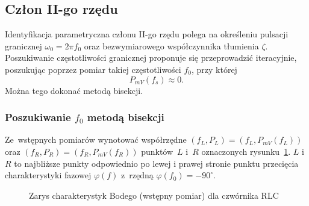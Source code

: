 \documentclass[paper=a4,DIV=12]{lpas}
\newcommand{\degree}{^{\circ}}
\begin{document}
\begin{appendices}
  \subsection{Człon II-go rzędu}
  \label{sec:YDUPM}

  Identyfikacja parametryczna członu II-go rzędu polega na określeniu pulsacji
  granicznej $\omega_0 = 2 \pi f_0$ oraz bezwymiarowego współczynnika tłumienia
  $\zeta$. Poszukiwanie częstotliwości granicznej proponuje się przeprowadzić
  iteracyjnie, poszukując poprzez pomiar takiej częstotliwości $f_0$, przy
  której
  \begin{equation}
    P_{mV}(f_s) \approx 0.
    \label{eq:8AO8B}
  \end{equation}
  Można tego dokonać metodą bisekcji.

  \subsubsection{Poszukiwanie $f_0$ metodą bisekcji}
  \label{sec:HVY4X}

  Ze~wstępnych pomiarów wynotować współrzędne $(f_L, P_L) = (f_L, P_{mV}(f_L))$
  oraz $(f_R, P_R) = (f_R, P_{mV}(f_R))$ punktów~$L$ i~$R$ oznaczonych
  rysunku~\ref{fig:WC8TU}. $L$ i~$R$ to najbliższe punkty odpowiednio po lewej
  i prawej stronie punktu przecięcia charakterystyki fazowej $\varphi(f)$
  z~rzędną $\varphi(f_0) = - 90\degree$.

  \begin{figure}[H]
    \centering
    
    \caption{Zarys charakterystyk Bodego (wstępny pomiar) dla czwórnika RLC}
    \label{fig:WC8TU}
  \end{figure}


\end{appendices}
\end{document}
